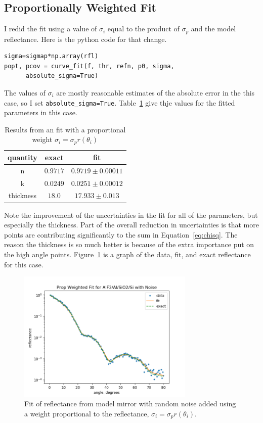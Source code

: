 \documentclass[english]{scrartcl}
\begin{document}
\subsection{Proportionally Weighted Fit}
I redid the fit using a value of $\sigma_i$ equal to the product
of $\sigma_p$ and the model reflectance. Here is the python code
for that change.
\begin{lstlisting}
sigma=sigmap*np.array(rfl)
popt, pcov = curve_fit(f, thr, refn, p0, sigma,
      absolute_sigma=True)

\end{lstlisting}
The values of $\sigma_i$ are mostly reasonable estimates of the
absolute error in the this case, so I set \verb+absolute_sigma=True+.
Table~\ref{tab:propweight} give thje values for the fitted parameters
in this case.
\begin{table}[htb]
\begin{center}
\begin{tabular}{| c | c | c |}
\hline
quantity & exact & fit\\ \hline\hline
n & $0.9717$ & $0.9719\pm 0.00011$\\
k & $0.0249$ & $0.0251\pm 0.00012$\\
thickness & $18.0$ & $17.933\pm 0.013$\\ \hline
\end{tabular}
\end{center}
\caption{\label{tab:propweight}Results from an fit with a
proportional weight $\sigma_i = \sigma_p r(\theta_i)$}
\end{table}
Note the improvement of the uncertainties in the fit for all of the
parameters, but especially the thickness. Part of the overall reduction
in uncertainties is that more points are contributing significantly
to the sum in Equation~\ref{eq:chisq}. The reason the thickness is
so much better is because of the extra importance put on the high
angle points.  Figure~\ref{fig:propweight} is a graph of the data, fit,
and exact reflectance for this case.
\begin{figure}[htb]
  \begin{center}
    \includegraphics[width=0.75\textwidth]{images/propweight}
  \end{center}
  \caption{\label{fig:propweight}Fit of reflectance from model mirror with random noise added using a weight proportional to the reflectance, $\sigma_i=\sigma_p r(\theta_i)$.}
\end{figure}
\end{document}
